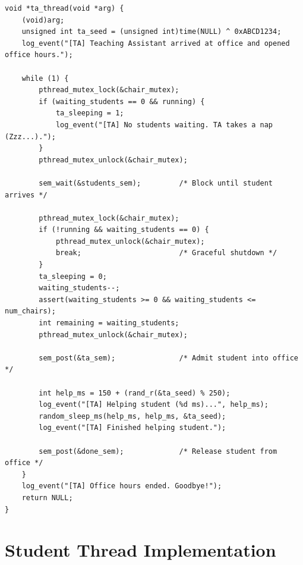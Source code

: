 \documentclass[12pt,a4paper]{report}
\begin{document}
\begin{lstlisting}[caption={Teaching Assistant thread -- src/ta.c (complete).}, label={lst:ta}]
void *ta_thread(void *arg) {
    (void)arg;
    unsigned int ta_seed = (unsigned int)time(NULL) ^ 0xABCD1234;
    log_event("[TA] Teaching Assistant arrived at office and opened office hours.");

    while (1) {
        pthread_mutex_lock(&chair_mutex);
        if (waiting_students == 0 && running) {
            ta_sleeping = 1;
            log_event("[TA] No students waiting. TA takes a nap (Zzz...).");
        }
        pthread_mutex_unlock(&chair_mutex);

        sem_wait(&students_sem);         /* Block until student arrives */

        pthread_mutex_lock(&chair_mutex);
        if (!running && waiting_students == 0) {
            pthread_mutex_unlock(&chair_mutex);
            break;                       /* Graceful shutdown */
        }
        ta_sleeping = 0;
        waiting_students--;
        assert(waiting_students >= 0 && waiting_students <= num_chairs);
        int remaining = waiting_students;
        pthread_mutex_unlock(&chair_mutex);

        sem_post(&ta_sem);               /* Admit student into office */

        int help_ms = 150 + (rand_r(&ta_seed) % 250);
        log_event("[TA] Helping student (%d ms)...", help_ms);
        random_sleep_ms(help_ms, help_ms, &ta_seed);
        log_event("[TA] Finished helping student.");

        sem_post(&done_sem);             /* Release student from office */
    }
    log_event("[TA] Office hours ended. Goodbye!");
    return NULL;
}
\end{lstlisting}

\section{Student Thread Implementation}
\end{document}

